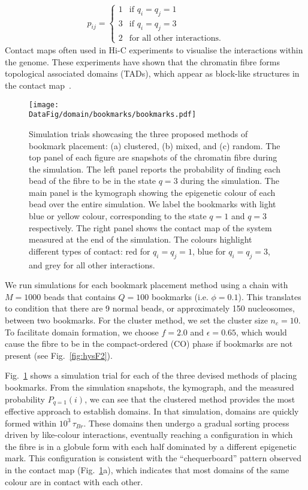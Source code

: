 \documentclass[12pt]{article}
\newcommand*{\DataFig}{/Users/MichaelChiang/Desktop/epigenetics_data/}
\begin{document}
\begin{eqnarray}
p_{ij} = \left\{ 
	\begin{array}{ll}
		1 & \textrm{if $q_i = q_j = 1$}\\
		3 & \textrm{if $q_i = q_j = 3$}\\
		2 & \textrm{for all other interactions}.
	\end{array}\right.
\end{eqnarray}
Contact maps often used in Hi-C experiments to visualise the interactions within the genome. These experiments have shown that the chromatin fibre forms topological associated domains (TADs), which appear as block-like structures in the contact map~\cite{aiden2009, dixon2012}. 

\begin{figure}[H]
\centering
\vspace{-2cm}
\captionsetup{width=1.1\textwidth}
\centerline{\texttt{[image: \\DataFig/domain/bookmarks/bookmarks.pdf]}}
\caption{Simulation trials showcasing the three proposed methods of bookmark placement: (a) clustered, (b) mixed, and (c) random. The top panel of each figure are snapshots of the chromatin fibre during the simulation. The left panel reports the probability of finding each bead of the fibre to be in the state $q = 3$ during the simulation. The main panel is the kymograph showing the epigenetic colour of each bead over the entire simulation. We label the bookmarks with light blue or yellow colour, corresponding to the state $q = 1$ and $q= 3$ respectively. The right panel shows the contact map of the system measured at the end of the simulation. The colours highlight different types of contact: red for $q_i = q_j = 1$, blue for $q_i = q_j = 3$, and grey for all other interactions.}
\label{fig:bookmark}
\end{figure}

We run simulations for each bookmark placement method using a chain with $M = 1000$ beads that contains $Q = 100$ bookmarks (i.e. $\phi = 0.1$). This translates to condition that there are 9 normal beads, or approximately 150 nucleosomes, between two bookmarks. For the cluster method, we set the cluster size $n_c = 10$. To facilitate domain formation, we choose $f = 2.0$ and $\epsilon = 0.65$, which would cause the fibre to be in the compact-ordered (CO) phase if bookmarks are not present (see Fig.~\ref{fig:hysF2}). 

Fig.~\ref{fig:bookmark} shows a simulation trial for each of the three devised methods of placing bookmarks. From the simulation snapshots, the kymograph, and the measured probability $P_{q=1}(i)$, we can see that the clustered method provides the most effective approach to establish domains. In that simulation, domains are quickly formed within $10^3\,\tau_{Br}$. These domains then undergo a gradual sorting process driven by like-colour interactions, eventually reaching a configuration in which the fibre is in a globule form with each half dominated by a different epigenetic mark. This configuration is consistent with the ``chequerboard'' pattern observed in the contact map (Fig.~\ref{fig:bookmark}a), which indicates that most domains of the same colour are in contact with each other. 
\end{document}
